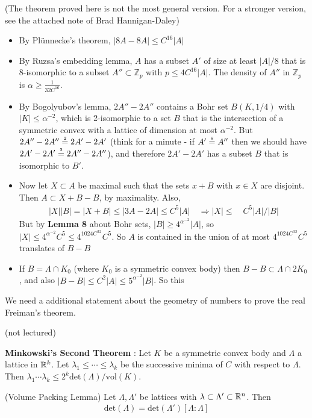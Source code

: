 \documentclass[10pt,a4paper]{report}
\newcommand{\xeq}[1]{\stackrel{\mathclap{\normalfont\mbox{\tiny{#1}}}}{=}}
\begin{document}
(The theorem proved here is not the most general version. For a stronger version, see the attached note of Brad Hannigan-Daley)
\s

\begin{itemize}
\item By Pl\"{u}nnecke's theorem, $|8A - 8A| \leq C^{16}|A|$
\item By Ruzsa's embedding lemma, $A$ has a subset $A'$ of size at least $|A|/8$ that is 8-isomorphic to a subset $A'' \subset\mathbb{Z}_p$ with $p \leq 4C^{16}|A|$. The density of $A''$ in $\mathbb{Z}_p$ is $\alpha \geq \frac{1}{32C^{16}}$.
\item By Bogolyubov's lemma, $2A'' - 2A''$ contains a Bohr set $B(K,1/4)$ with $|K|\leq \alpha^{-2}$, which is 2-isomorphic to a set $B$ that is the intersection of a symmetric convex with a lattice of dimension at most $\alpha^{-2}$. But $2A'' - 2A'' \xeq{2} 2A' -2A'$ (think for a minute - if $A' \xeq{8} A''$ then we should have $2A'-2A' \xeq{2} 2A''-2A''$), and therefore $2A' - 2A'$ has a subset $B$ that is isomorphic to $B'$. 
\item Now let $X \subset A$ be maximal such that the sets $x + B$ with $x\in X$ are disjoint. Then $A \subset X + B-B$, by maximality. Also,
\begin{align*}
|X||B| = |X+B| \leq |3A-2A| \leq C^5 |A| \quad \Rightarrow |X|\leq \quad C^5 |A|/|B|
\end{align*}
But by \textbf{Lemma 8} about Bohr sets, $|B| \geq 4^{\alpha^{-2}} |A|$, so $|X| \leq 4^{\alpha^{-2}}C^5 \leq 4^{1024 C^{32}} C^5$. So $A$ is contained in the union of at most $4^{1024 C^{32}} C^5$ translates of $B-B$
\item If $B = \Lambda \cap K_0$ (where $K_0$ is a symmetric convex body) then $B-B \subset \Lambda \cap 2K_0$, and also $|B-B|\leq C^2 |A| \leq 5^{\alpha^{-2}}|B|$. So this 
\end{itemize}

We need a additional statement about the geometry of numbers to prove the real Freiman's theorem.
\s

\digression

(not lectured)
\s

\textbf{Minkowski's Second Theorem} : Let $K$ be a symmetric convex body and $\Lambda$ a lattice in $\mathbb{R}^k$. Let $\lambda_1 \leq \cdots \leq \lambda_k$ be the successive minima of $C$ with respect to $\Lambda$. Then $\lambda_1 \cdots \lambda_k \leq 2^k \text{det}(\Lambda)/\text{vol}(K)$.
\s

\lem (Volume Packing Lemma) Let $\Lambda, \Lambda'$ be lattices with $\lambda \subset \Lambda' \subset \mathbb{R}^n$. Then
\begin{align*}
\text{det}(\Lambda) = \text{det}(\Lambda')[\Lambda : \Lambda]
\end{align*}
\s
\end{document}
